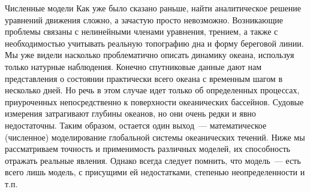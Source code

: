 
\begin{chapter}{Численные модели}\label{chap:15}
Как уже было сказано раньше, найти аналитическое решение уравнений
движения сложно, а зачастую просто невозможно. Возникающие проблемы
связаны с нелинейными членами уравнения, трением, а также с
необходимостью учитывать реальную топографию дна и форму береговой
линии. Мы уже видели насколько проблематично описать динамику океана,
используя только натурные наблюдения. Конечно спутниковые данные дают
нам представления о состоянии практически всего океана с временным
шагом в несколько дней. Но речь в этом случае идет только об
определенных процессах, приуроченных непосредственно к поверхности
океанических бассейнов. Судовые измерения затрагивают глубины океанов,
но они очень редки и явно недостаточны. Таким образом, остается один
выход~---  математическое (численное) моделирование глобальной системы
океанических течений. Ниже мы рассматриваем точность и применимость
различных моделей, их способность отражать реальные явления. Однако
всегда следует помнить, что модель~--- есть всего лишь модель, с
присущими ей недостатками, степенью неопределенности и т.п.
%


\end{chapter}
